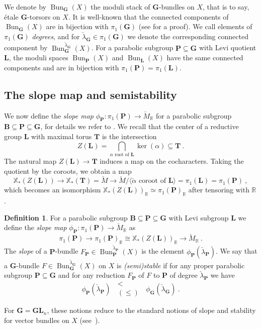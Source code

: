 \documentclass[10pt, a4paper]{amsart}
\theoremstyle{definition}
\newtheorem{definition}[theorem]{Definition}
\theoremstyle{myitemstyle}
\newcommand{\R}{\mathbb{R}}
\newcommand{\RR}{\mathbb{R}}
\newcommand{\Mcheck}{{\check{M}}}
\newcommand{\lambdacheck}{\check{\lambda}}
\newcommand{\alphacheck}{\check{\alpha}}
\newcommand{\bfG}{\mathbf{G}}
\newcommand{\bfT}{\mathbf{T}}
\newcommand{\bfL}{\mathbf{L}}
\newcommand{\bfP}{\mathbf{P}}
\newcommand{\bfB}{\mathbf{B}}
\newcommand{\bGL}{\mathbf{GL}}
\DeclareMathOperator{\Bun}{Bun}
\begin{document}
We denote by $\Bun_\bfG(X)$ the moduli stack of $\bfG$-bundles on $X$, that is to say, \'etale $\bfG$-torsors on $X$. It is well-known that the connected components of $\Bun_\bfG(X)$ are in bijection with $\pi_1(\bfG)$ (see \cite[Theorem 5.8]{Hoffmann} for a proof). We call elements of $\pi_1(\bfG)$ \emph{degrees}, and for $\lambdacheck_\bfG\in \pi_1(\bfG)$ we denote the corresponding connected component by $\Bun^{\lambdacheck_\bfG}_\bfG(X)$. For a parabolic subgroup $\bfP \subseteq \bfG$ with Levi quotient $\bfL$, the moduli spaces $\Bun_\bfP(X)$ and $\Bun_\bfL(X)$ have the same connected components and are in bijection with $\pi_1(\bfP)=\pi_1(\bfL)$. 

\subsection{The slope map and semistability}

We now define the \emph{slope map} $\phi_\bfP: \pi_1(\bfP) \to \Mcheck_\R$ for a parabolic subgroup $\bfB \subseteq \bfP \subseteq \bfG$, for details we refer to \cite{schieder2015harder}. We recall that the center of a reductive group $\bfL$ with maximal torus $\bfT$ is the intersection
\[
    Z(\bfL) = \bigcap_{\alpha \text{ root of }\bfL} \ker(\alpha) \subseteq \bfT \ .
\] The natural map $Z(\bfL) \to \bfT$ induces a map on the cocharacters. Taking the quotient by the coroots, we obtain a map
\[
    \mathbb{X}_{*}(Z(\bfL)) \to \mathbb{X}_{*}(\bfT) = \Mcheck \to \Mcheck / \langle \alphacheck \text{ coroot of } \bfL \rangle = \pi_1(\bfL)=\pi_1(\bfP) \ ,
\]
which becomes an isomorphism $\mathbb{X}_{*}(Z(\bfL))_\RR \simeq \pi_1(\bfP)_\RR$ after tensoring with $\RR$.

\begin{definition}
    For a parabolic subgroup $\bfB \subseteq \bfP \subseteq \bfG$ with Levi subgroup $\bfL$ we define the \emph{slope map} $\phi_\bfP: \pi_1(\bfP) \to \Mcheck_\RR$ as 
     \[
     \pi_1(\bfP) \to \pi_1(\bfP)_\RR \cong \mathbb{X}_{*}(Z(\bfL))_\RR \to \Mcheck_\RR \ .
    \]
The \emph{slope} of a $\bfP$-bundle $F_\bfP \in \Bun_\bfP^{\lambdacheck_\bfP}(X)$ is the element $\phi_\bfP(\lambdacheck_\bfP)$. We say that a $\bfG$-bundle $F \in \Bun^{\lambdacheck_\bfG}_\bfG(X)$ on $X$ is \emph{(semi)stable} if for any proper parabolic subgroup $\bfP \subseteq \bfG$ and for any reduction $F_\bfP$ of $F$ to $\bfP$ of degree $\lambdacheck_\bfP$ we have
\[    
    \phi_\bfP(\lambdacheck_\bfP) \,\,\ \substack{<\\(\leq)} \,\,\  \phi_\bfG(\lambdacheck_\bfG) \ .
\]
\end{definition}
For $\bfG= \bGL_n$, these notions reduce to the standard notions of slope and stability for vector bundles on $X$ (see~\cite[Section 2.2.4]{schieder2015harder}). 
\end{document}
